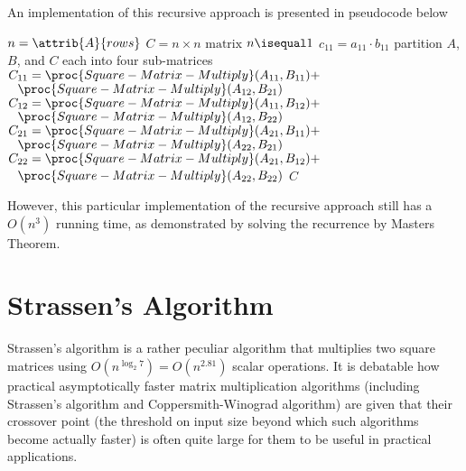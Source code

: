 An implementation of this recursive approach is presented in pseudocode below
\begin{codebox}
    \li $n = \attrib{A}{rows}$
    \li $C = \text{$n\times n$ matrix}$ 
    \li \If $n \isequal 1$ \Then
        \li $c_{11} = a_{11} \cdot b_{11}$
    \Else
        \li partition $A$, $B$, and $C$ each into four sub-matrices
        \li $C_{11} = \proc{Square-Matrix-Multiply}(A_{11},B_{11}) + $
        \zi \> $\phantom{=}\proc{Square-Matrix-Multiply}(A_{12},B_{21})$
        \li $C_{12} = \proc{Square-Matrix-Multiply}(A_{11},B_{12}) + $
        \zi \> $\phantom{=}\proc{Square-Matrix-Multiply}(A_{12},B_{22})$
        \li $C_{21} = \proc{Square-Matrix-Multiply}(A_{21},B_{11}) + $
        \zi \> $\phantom{=}\proc{Square-Matrix-Multiply}(A_{22},B_{21})$
        \li $C_{22} = \proc{Square-Matrix-Multiply}(A_{21},B_{12}) + $
        \zi \> $\phantom{=}\proc{Square-Matrix-Multiply}(A_{22},B_{22})$
    \End
    \li \Return $C$ 
\end{codebox}
However, this particular implementation of the recursive approach still has a $O(n^3)$ running time, as demonstrated by solving the recurrence by Masters Theorem.

\section{Strassen's Algorithm} 

Strassen's algorithm is a rather peculiar algorithm that multiplies two square matrices using $O(n^{\log_2 7}) = O(n^{2.81})$ scalar operations. It is debatable how practical asymptotically faster matrix multiplication algorithms (including Strassen's algorithm and Coppersmith-Winograd algorithm) are given that their crossover point (the threshold on input size beyond which such algorithms become actually faster) is often quite large for them to be useful in practical applications.

